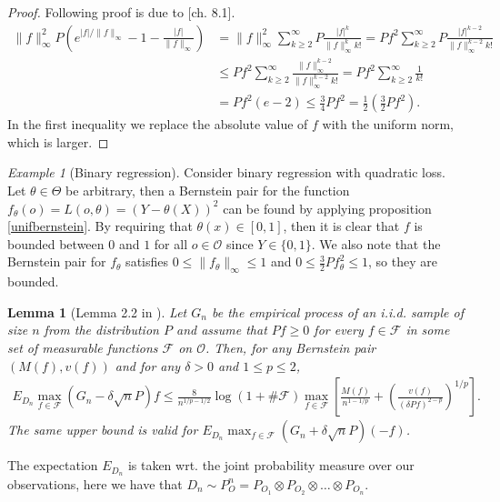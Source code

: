 \documentclass[11pt, a4paper]{article}
\newcommand\norm[1]{\lVert#1\rVert}
\newtheorem{lemma}[theorem]{Lemma}
\theoremstyle{definition}
\theoremstyle{remark}
\newtheorem{example}{Example}
\newcommand{\btheta}{\theta}
\begin{document}
\begin{proof}
    Following proof is due to \parencite{vaart06}[ch. 8.1]. 
    \begin{align*}
        \norm{f}_{\infty}^2 P\left( e^{|f|/\norm{f}_{\infty}} -1 - \frac{|f|}{\norm{f}_{\infty}}\right) &= \norm{f}_{\infty}^{2} \sum_{k \geq 2}^{\infty} P \frac{|f|^{k}}{\norm{f}^{k}_{\infty}k!} = Pf^2 \sum_{k \geq 2}^{\infty} P\frac{|f|^{k-2}}{\norm{f}^{k-2}_{\infty} k! } \\
                                                                                                        &\leq P f^2 \sum_{k \geq 2}^{\infty} \frac{\norm{f}_{\infty}^{k-2}}{\norm{f}^{k-2}_{\infty} k! } = P f^2 \sum_{k \geq 2}^{\infty} \frac{1}{k !}\\
                                                                                                        &= P f^2 (e-2)\leq \frac{3}{4} P f^2 = \frac{1}{2} \left(\frac{3}{2} Pf^2\right). 
    \end{align*}
   In the first inequality we replace the absolute value of $ f $ with the uniform norm, which is larger. 
\end{proof}

\begin{example}[Binary regression] \label{ex:bernsteinexample}
    Consider binary regression with quadratic loss. Let $ \btheta \in \Theta $ be arbitrary, then a Bernstein pair for the function $ f_{\btheta}(o) = L(o, \btheta) = (Y - \theta(X))^2$ can be found by applying proposition \ref{unifbernstein}. By requiring that $ \theta(x) \in [0,1] $, then it is clear that $ f $ is bounded between $ 0 $ and $ 1 $ for all $ o \in \mathcal{O} $ since $ Y \in \{0,1\} $. We also note that the Bernstein pair for $ f_{\btheta} $ satisfies $ 0 \leq \norm{f_\theta}_{\infty} \leq 1 $ and $ 0 \leq \frac{3}{2}Pf_{\btheta}^2 \leq 1 $, so they are bounded. 

\end{example}


\begin{lemma}[Lemma 2.2 in \parencite{vaart06}] \label{finitesamplebound}
    Let $G_{n}$ be the empirical process of an i.i.d. sample of size $n$ from the distribution $P$ and assume that $P f \geq 0$ for every $f \in \mathcal{F}$ in some set of measurable functions $ \mathcal{F} $ on $ \mathcal{O} $. Then, for any Bernstein pair $(M(f), v(f))$ and for any $\delta>0$ and $1 \leq p \leq 2$,
    \begin{align*}
        E_{D_n} \max_{f \in \mathcal{F}}(G_n-\delta \sqrt{n} P) f \leq \frac{8}{n^{1 / p-1 / 2}} \log (1+\# \mathcal{F}) \max _{f \in \mathcal{F}}\left[\frac{M(f)}{n^{1-1 / p}}+\left(\frac{v(f)}{(\delta P f)^{2-p}}\right)^{1 / p}\right].
    \end{align*}
    The same upper bound is valid for $ E_{D_n} \max_{f \in \mathcal{F}}(G_n+\delta \sqrt{n} P)(-f) $. 
\end{lemma}
The expectation $ E_{D_n} $ is taken wrt. the joint probability measure over our observations, here we have that $ D_n \sim P_{O}^{n} = P_{O_1} \otimes P_{O_2} \otimes \dots \otimes P_{O_n} $. 
\end{document}
